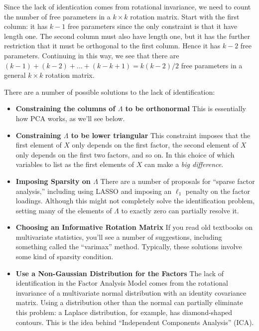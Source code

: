 Since the lack of identication comes from rotational invariance, we need to count the number of free parameters in a $k\times k$ rotation matrix. Start with the first column: it has $k-1$ free parameters since the only constraint is that it have length one. The second column must also have length one, but it has the further restriction that it must be orthogonal to the first column. Hence it has $k - 2$ free parameters. Continuing in this way, we see that there are $(k - 1) + (k - 2) + \hdots + (k - k + 1) = k(k-2)/2$ free parameters in a general $k\times k$ rotation matrix. 

There are a number of possible solutions to the lack of identification:
	\begin{itemize}
		\item \textbf{Constraining the columns of $\Lambda$ to be orthonormal} This is essentially how PCA works, as we'll see below.
		\item \textbf{Constraining $\Lambda$ to be lower triangular} This constraint imposes that the first element of $X$ only depends on the first factor, the second element of $X$ only depends on the first two factors, and so on. In this choice of which variables to list as the first elements of $X$ can make a \emph{big difference}.
		\item \textbf{Imposing Sparsity on $\Lambda$} There are a number of proposals for ``sparse factor analysis,'' including using LASSO and imposing an $\ell_1$ penalty on the factor loadings. Although this might not completely solve the identification problem, setting many of the elements of $\Lambda$ to exactly zero can partially resolve it. 
		\item \textbf{Choosing an Informative Rotation Matrix} If you read old textbooks on multivariate statistics, you'll see a number of suggestions, including something called the ``varimax'' method. Typically, these solutions involve some kind of sparsity condition.
		\item \textbf{Use a Non-Gaussian Distribution for the Factors} The lack of identification in the Factor Analysis Model comes from the rotational invariance of a multivariate normal distribution with an identity covariance matrix. Using a distribution other than the normal can partially eliminate this problem: a Laplace distribution, for example, has diamond-shaped contours. This is the idea behind ``Independent Components Analysis'' (ICA).
	\end{itemize}



